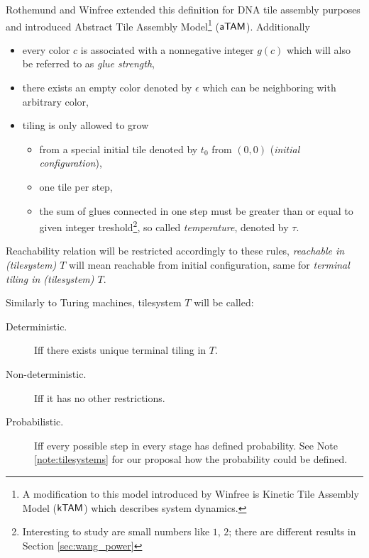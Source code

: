 	Rothemund and Winfree \cite{square_lb} extended this definition for DNA tile assembly purposes and introduced Abstract Tile Assembly Model\footnote{A modification to this model introduced by Winfree is Kinetic Tile Assembly Model ($\mathsf{kTAM}$) which describes system dynamics.} ($\mathsf{aTAM}$). Additionally
	\begin{itemize}
		\item every color $c$ is associated with a nonnegative integer $g(c)$ which will also be referred to as {\em glue strength},
		\item there exists an empty color denoted by $\epsilon$ which can be neighboring with arbitrary color,
		\item tiling is only allowed to grow
		\begin{itemize}
			\item from a special initial tile denoted by $t_0$ from $(0,0)$ ({\em initial configuration}),
			\item one tile per step,
			\item the sum of glues connected in one step must be greater than or equal to given integer treshold\footnote{Interesting to study are small numbers like $1$, $2$; there are different results in Section \ref{sec:wang_power}}, so called {\em temperature}, denoted by $\tau$.
		\end{itemize}
	\end{itemize}
	Reachability relation will be restricted accordingly to these rules, {\em reachable in (tilesystem) $T$} will mean reachable from initial configuration, same for {\em terminal tiling in (tilesystem) $T$}.
	
	Similarly to Turing machines, tilesystem $T$ will be called:
	\begin{description}
		\item[Deterministic.] Iff there exists unique terminal tiling in $T$. %
		\item[Non-deterministic.] Iff it has no other restrictions. %
		\item[Probabilistic.] Iff every possible step in every stage has defined probability. See Note \ref{note:tilesystems} for our proposal how the probability could be defined.
	\end{description}
	
